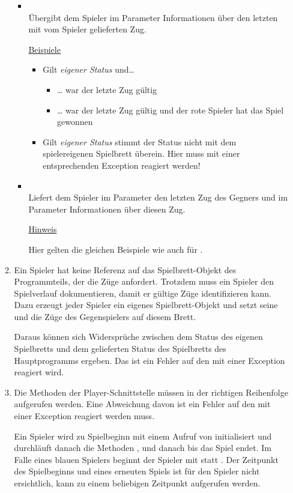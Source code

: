 \begin{enumerate}
\begin{enumerate}
\begin{itemize}[leftmargin=4em]
\item[\code{confirm}] \hfill \\Übergibt dem Spieler im Parameter  Informationen über den letzten mit  vom Spieler gelieferten Zug.

\underline{Beispiele}
\begin{itemize}
\item Gilt \textit{eigener Status} und\dots
\begin{itemize}
\item \dots {} war der letzte Zug gültig
\item \dots {} war der letzte Zug gültig und der rote Spieler hat das Spiel gewonnen
\end{itemize}
\item Gilt \textit{eigener Status} stimmt der Status nicht mit dem spielereigenen Spielbrett überein. Hier muss mit einer entsprechenden Exception reagiert werden!
\end{itemize}
\item[\code{update}] \hfill \\Liefert dem Spieler im Parameter  den letzten Zug des Gegners und im Parameter  Informationen über diesen Zug.

\underline{Hinweis}

Hier gelten die gleichen Beispiele wie auch für .
\end{itemize}

\item Ein Spieler hat keine Referenz auf das Spielbrett-Objekt des Programmteils, der die Züge anfordert. Trotzdem muss ein Spieler den Spielverlauf dokumentieren, damit er gültige Züge identifizieren kann. Dazu erzeugt jeder Spieler ein eigenes Spielbrett-Objekt und setzt seine und die Züge des Gegenspielers auf diesem Brett.

Daraus können sich Widersprüche zwischen dem Status des eigenen Spielbretts und dem gelieferten Status des Spielbretts des Hauptprogramms ergeben. Das ist ein Fehler auf den mit einer Exception reagiert wird.

\item Die Methoden der Player-Schnittstelle müssen in der richtigen Reihenfolge aufgerufen werden. Eine Abweichung davon ist ein Fehler auf den mit einer Exception reagiert werden muss.

Ein Spieler wird zu Spielbeginn mit einem Aufruf von  initialisiert und durchläuft danach die Methoden ,  und danach  bis das Spiel endet. Im Falle eines blauen Spielers beginnt der Spieler mit  statt . Der Zeitpunkt des Spielbeginns und eines erneuten Spiels ist für den Spieler nicht ersichtlich,  kann zu einem beliebigen Zeitpunkt aufgerufen werden.


\end{enumerate}
\end{enumerate}
